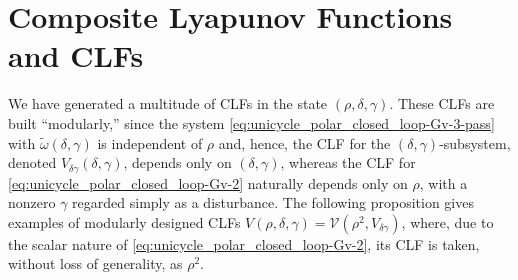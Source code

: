 \documentclass[journal,twoside,web]{ieeecolor}
\theoremstyle{definition}
\begin{document}



\section{Composite Lyapunov Functions and CLFs}
\label{sec:composite}
We have generated a multitude of CLFs in the state $(\rho,\delta,\gamma)$. These CLFs are built ``modularly,'' since the system \eqref{eq:unicycle_polar_closed_loop-Gv-3-pass} with $\tilde\omega(\delta,\gamma)$ is independent of $\rho$ and, hence, the CLF for the $(\delta,\gamma)$-subsystem, denoted $V_{\delta\gamma}(\delta,\gamma)$, depends only on  $(\delta,\gamma)$, whereas the CLF for \eqref{eq:unicycle_polar_closed_loop-Gv-2}
naturally depends only on $\rho$, with a nonzero $\gamma$ regarded simply as a disturbance. 
The following proposition gives examples of modularly designed CLFs $V(\rho,\delta,\gamma) = \mathcal{V}(\rho^2,V_{\delta\gamma})$, where, due to the scalar nature of \eqref{eq:unicycle_polar_closed_loop-Gv-2}, its CLF is taken, without loss of generality, as $\rho^2$. 
\end{document}
